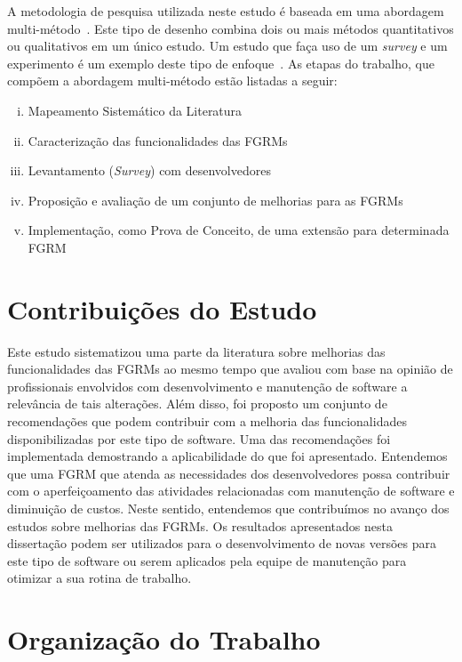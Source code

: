 A metodologia de pesquisa utilizada neste estudo é baseada em uma abordagem
multi-método~\cite{hesse2010mixed}. Este tipo de desenho combina dois ou mais
métodos quantitativos ou qualitativos em um único estudo. Um estudo que faça
uso de um \textit{survey} e um experimento é um exemplo deste tipo de
enfoque~\cite{hesse2010mixed}. As etapas do trabalho, que compõem a abordagem
multi-método estão listadas a seguir:

\begin{enumerate}[(i)]
	\item Mapeamento Sistemático da Literatura~\cite{Petersen2008}
	\item Caracterização das funcionalidades das FGRMs
    \item Levantamento (\textit{Survey}) com
          desenvolvedores~\cite{wohlin2012experimentation}
	\item Proposição e avaliação de um conjunto de melhorias para as FGRMs
    \item Implementação, como Prova de Conceito, de uma extensão para
        determinada FGRM
\end{enumerate}

\section{Contribuições do Estudo}
\label{sec:intro-contribuicao}

Este estudo sistematizou uma parte da literatura sobre melhorias das
funcionalidades das FGRMs ao mesmo tempo que avaliou com base na opinião de
profissionais envolvidos com desenvolvimento e manutenção de software a
relevância de tais alterações. Além disso, foi proposto um conjunto de
recomendações que podem contribuir com a melhoria das funcionalidades
disponibilizadas por este tipo de software. Uma das recomendações foi
implementada demostrando a aplicabilidade do que foi apresentado. Entendemos
que uma FGRM que atenda as necessidades dos desenvolvedores possa contribuir
com o aperfeiçoamento das atividades relacionadas com manutenção de software e
diminuição de custos. Neste sentido, entendemos que contribuímos no avanço dos
estudos sobre melhorias das FGRMs. Os resultados apresentados nesta dissertação
podem ser utilizados para o desenvolvimento de novas versões para este tipo de
software ou serem aplicados pela equipe de manutenção para otimizar a sua
rotina de trabalho.

\section{Organização do Trabalho}
\label{sec:intro-organizacao-dissertacao}

